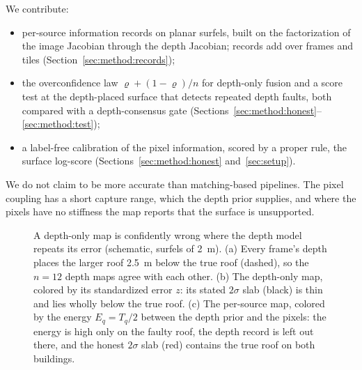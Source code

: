 We contribute:
\begin{itemize}
  \item per-source information records on planar surfels, built on the factorization of the image Jacobian
        through the depth Jacobian; records add over frames and tiles (Section~\ref{sec:method:records});
  \item the overconfidence law $\varrho+(1-\varrho)/n$ for depth-only fusion and a score test at the
        depth-placed surface that detects repeated depth faults, both compared with a depth-consensus gate
        (Sections~\ref{sec:method:honest}--\ref{sec:method:test});
  \item a label-free calibration of the pixel information, scored by a proper rule, the surface log-score
        (Sections~\ref{sec:method:honest} and~\ref{sec:setup}).
\end{itemize}
We do not claim to be more accurate than matching-based pipelines. The pixel coupling has a short capture
range, which the depth prior supplies, and where the pixels have no stiffness the map reports that the
surface is unsupported.

\begin{figure}[!t]
\centering

\caption{A depth-only map is confidently wrong where the depth model repeats its error (schematic, surfels of
2~m). (a) Every frame's depth places the larger roof 2.5~m below the true roof (dashed), so the $n=12$ depth
maps agree with each other. (b) The depth-only map, colored by its standardized error $z$: its stated
$2\sigma$ slab (black) is thin and lies wholly below the true roof. (c) The per-source map, colored by the
energy $E_q=T_q/2$ between the depth prior and the pixels: the energy is high only on the faulty roof, the depth
record is left out there, and the honest $2\sigma$ slab (red) contains the true roof on both buildings.}
\label{fig:teaser}
\end{figure}
